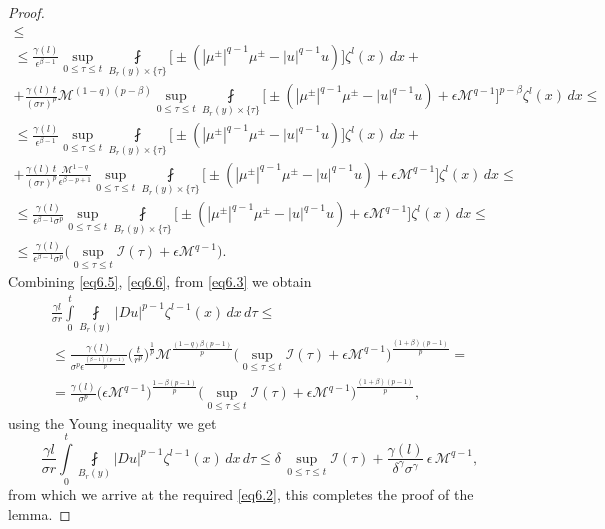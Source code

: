 \documentclass[a4paper,11pt,fullpage]{article}
\numberwithin{equation}{section}
\begin{document}
\begin{proof}
\begin{multline}
\leqslant \\\leqslant  \frac{\gamma(l)}{\epsilon^{\beta-1}}\sup\limits_{0\leqslant \tau\leqslant t}\fint\limits_{B_{r}(y)\times\{\tau\}}
\big[\pm(|\mu^{\pm}|^{q-1}\mu^{\pm}-|u|^{q-1}u)\big]\zeta^l(x)\,dx+\\+\frac{\gamma(l)\,t}{(\sigma r)^p}\mathcal{M}^{(1-q)(p-\beta)}\sup\limits_{0\leqslant \tau\leqslant t}\fint\limits_{B_{r}(y)\times\{\tau\}}
\big[\pm(|\mu^{\pm}|^{q-1}\mu^{\pm}-|u|^{q-1}u)+\epsilon \mathcal{M}^{q-1}\big]^{p-\beta}\zeta^l(x)\,dx\leqslant 
\\\leqslant \frac{\gamma(l)}{\epsilon^{\beta-1}}\sup\limits_{0\leqslant \tau\leqslant t}\fint\limits_{B_{r}(y)\times\{\tau\}}
\big[\pm(|\mu^{\pm}|^{q-1}\mu^{\pm}-|u|^{q-1}u)\big]\zeta^l(x)\,dx+\\+\frac{\gamma(l)\,t}{(\sigma r)^p}\frac{\mathcal{M}^{1-q}}{\epsilon^{\beta-p+1}}\sup\limits_{0\leqslant \tau\leqslant t}\fint\limits_{B_{r}(y)\times\{\tau\}}
\big[\pm(|\mu^{\pm}|^{q-1}\mu^{\pm}-|u|^{q-1}u)+\epsilon \mathcal{M}^{q-1}\big]\zeta^l(x)\,dx\leqslant\\\leqslant
\frac{\gamma(l)}{\epsilon^{\beta-1}\sigma^p}\sup\limits_{0\leqslant \tau\leqslant t}\fint\limits_{B_{r}(y)\times\{\tau\}}
\big[\pm(|\mu^{\pm}|^{q-1}\mu^{\pm}-|u|^{q-1}u)+\epsilon \mathcal{M}^{q-1}\big]\zeta^l(x)\,dx\leqslant\\\leqslant\frac{\gamma(l)}{ \epsilon^{\beta-1}\sigma^p}\Big(\sup\limits_{0\leqslant \tau\leqslant t}\mathcal{I}(\tau)+\epsilon \mathcal{M}^{q-1}\Big).
\end{multline}
Combining \eqref{eq6.5}, \eqref{eq6.6}, from \eqref{eq6.3} we obtain
\begin{multline*}
\frac{\gamma l}{\sigma r}\int\limits^t_0\fint\limits_{B_{r}(y)}|D u|^{p-1} \zeta^{l-1}(x)\,dx\,d\tau\leqslant\\\leqslant
\frac{\gamma(l)}{\sigma^p \epsilon^{\frac{(\beta-1)(p-1)}{p}}}\Big(\frac{t}{r^p}\Big)^{\frac{1}{p}}\mathcal{M}^{\frac{(1-q)\beta(p-1)}{p}}
\Big(\sup\limits_{0\leqslant \tau\leqslant t}\mathcal{I}(\tau)+\epsilon \mathcal{M}^{q-1}\Big)^{\frac{(1+\beta)(p-1)}{p}}=\\=
\frac{\gamma(l)}{\sigma^p}\big(\epsilon \mathcal{M}^{q-1}\big)^{\frac{1-\beta(p-1)}{p}}\Big(\sup\limits_{0\leqslant \tau\leqslant t}\mathcal{I}(\tau)+\epsilon \mathcal{M}^{q-1}\Big)^{\frac{(1+\beta)(p-1)}{p}},
\end{multline*}
using the Young inequality we get
\begin{equation*}
\frac{\gamma l}{\sigma r}\int\limits^t_0\fint\limits_{B_{ r}(y)}|D u|^{p-1} \zeta^{l-1}(x)\,dx\,d\tau\leqslant
\delta\,\sup\limits_{0\leqslant \tau\leqslant t}\mathcal{I}(\tau)+\frac{\gamma(l)}{\delta^\gamma \sigma^\gamma}\,\epsilon\,\mathcal{M}^{q-1},
\end{equation*}
from which we arrive at the required \eqref{eq6.2}, this completes the proof of the lemma.
\end{proof}
\end{document}
